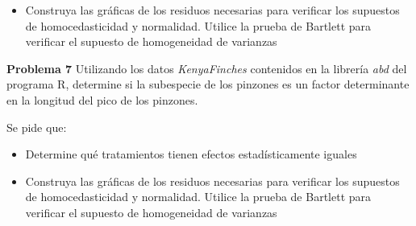 \documentclass[a4paper]{scrartcl}\usepackage[]{graphicx}\usepackage[]{color}
\begin{document}

\begin{itemize}
  \item Construya las gráficas de los residuos necesarias para verificar los supuestos de homocedasticidad y normalidad. Utilice la prueba de Bartlett para verificar el supuesto de homogeneidad de varianzas 
\end{itemize}

\newpage
\textbf{Problema 7}
Utilizando los datos \emph{KenyaFinches} contenidos en la librería \emph{abd} del programa R, determine si la subespecie de los pinzones es un factor determinante en la longitud del pico de los pinzones.

Se pide que:


\begin{itemize}
  \item Determine qué tratamientos tienen efectos estadísticamente iguales
\end{itemize}

\begin{itemize}
  \item Construya las gráficas de los residuos necesarias para verificar los supuestos de homocedasticidad y normalidad. Utilice la prueba de Bartlett para verificar el supuesto de homogeneidad de varianzas 
\end{itemize}
\end{document}
